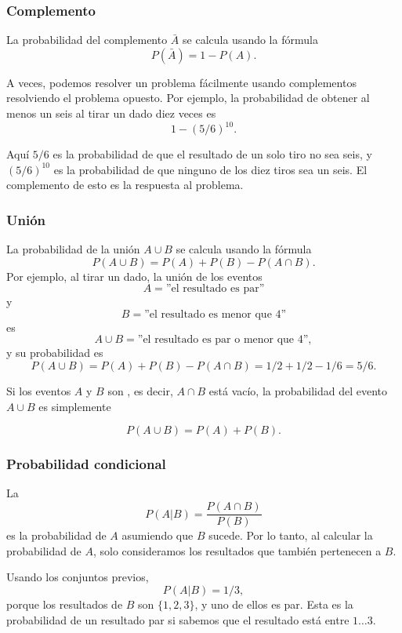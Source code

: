 \subsubsection{Complemento}

La probabilidad del complemento
$\bar A$ se calcula usando la fórmula
\[P(\bar A)=1-P(A).\]

A veces, podemos resolver un problema fácilmente
usando complementos resolviendo el problema opuesto.
Por ejemplo, la probabilidad de obtener
al menos un seis al tirar un dado diez veces es
\[1-(5/6)^{10}.\]

Aquí $5/6$ es la probabilidad de que el resultado
de un solo tiro no sea seis, y
$(5/6)^{10}$ es la probabilidad de que ninguno de
los diez tiros sea un seis.
El complemento de esto es la respuesta al problema.

\subsubsection{Unión}

La probabilidad de la unión $A \cup B$
se calcula usando la fórmula
\[P(A \cup B)=P(A)+P(B)-P(A \cap B).\]
Por ejemplo, al tirar un dado,
la unión de los eventos
\[A=\textrm{''el resultado es par''}\]
y
\[B=\textrm{''el resultado es menor que 4''}\]
es
\[A \cup B=\textrm{''el resultado es par o menor que 4''},\]
y su probabilidad es
\[P(A \cup B) = P(A)+P(B)-P(A \cap B)=1/2+1/2-1/6=5/6.\]

Si los eventos $A$ y $B$ son , es decir,
$A \cap B$ está vacío,
la probabilidad del evento $A \cup B$ es simplemente

\[P(A \cup B)=P(A)+P(B).\]

\subsubsection{Probabilidad condicional}


La 
\[P(A | B) = \frac{P(A \cap B)}{P(B)}\]
es la probabilidad de $A$
asumiendo que $B$ sucede.
Por lo tanto, al calcular la
probabilidad de $A$, solo consideramos los resultados
que también pertenecen a $B$.

Usando los conjuntos previos,
\[P(A | B)= 1/3,\]
porque los resultados de $B$ son
$\{1,2,3\}$, y uno de ellos es par.
Esta es la probabilidad de un resultado par
si sabemos que el resultado está entre $1 \ldots 3$.

